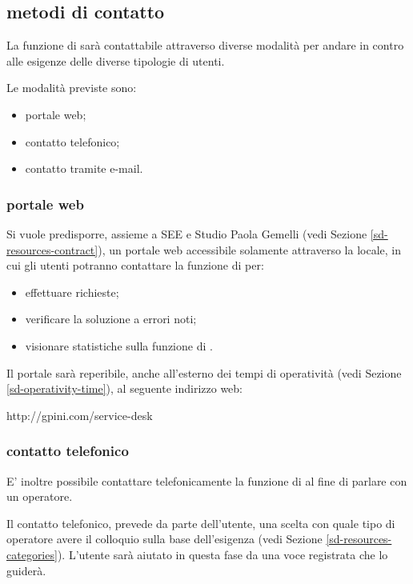 \subsection[Metodi di contatto]{metodi di contatto}
\label{sd-contact-mode}
La funzione di  sarà contattabile attraverso diverse modalità per andare in contro alle esigenze delle diverse tipologie di utenti.

Le modalità previste sono:

\begin{itemize}
\item{portale web;}
\item{contatto telefonico;}
\item{contatto tramite e-mail.}
\end{itemize}

\subsubsection[Portale Web]{portale web}
Si vuole predisporre, assieme a SEE e Studio Paola Gemelli (vedi Sezione \ref{sd-resources-contract}), un portale web accessibile solamente attraverso la  locale, in cui gli utenti potranno contattare la funzione di  per:

\begin{itemize}
\item{effettuare richieste;}
\item{verificare la soluzione a errori noti;}
\item{visionare statistiche sulla funzione di .}
\end{itemize}

Il portale sarà reperibile, anche all'esterno dei tempi di operatività (vedi Sezione \ref{sd-operativity-time}), al seguente indirizzo web: 

\begin{center}
http://gpini.com/service-desk
\end{center}

\subsubsection[Contatto telefonico]{contatto telefonico}
E' inoltre possibile contattare telefonicamente la funzione di  al fine di parlare con un operatore. 

Il contatto telefonico, prevede da parte dell'utente, una scelta con quale tipo di operatore avere il colloquio sulla base dell'esigenza (vedi Sezione \ref{sd-resources-categories}). L'utente sarà aiutato in questa fase da una voce registrata che lo guiderà.

